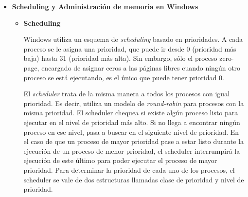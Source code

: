 \documentclass[a4paper,11pt] {article}
\begin{document}
\begin{itemize}
\begin{verbatim}
        input_semilla = (char *)vmalloc(PAGE_SIZE);
        memset(input_semilla, 0, PAGE_SIZE);

        proc_entry = create_proc_entry("probabilidad", 0644, NULL);
    
        if(proc_entry == NULL) {
            printk(KERN_INFO "probabilidad: No se pudo crear la 
              entrada en /proc\n");
        } else {
            proc_entry->read_proc = cant_lecturas;
            proc_entry->write_proc = cambiar_semilla;
            proc_entry->owner = THIS_MODULE;
        }
    }

    return ret;
}

static void __exit probabilidad_exit(void) {
    //Elimino la entrada de proc
    remove_proc_entry("probabilidad", &proc_root);
    vfree(input_semilla);
    //Elimino el dispositivo
    misc_deregister(&probabilidad_dev);
}

module_init(probabilidad_init);
module_exit(probabilidad_exit);
\end{verbatim}  

	El presente módulo se encarga de crear un dipositivo de tipo MISC en /dev/probabilidad que, al ser leído, retorna una letra aleatoria. Para leer el dispositivo, basta con ejecutar el comando \textbf{cat /dev/probabilidad}. Además, provee la opción de cambiar la semilla utilizada para ir generando la secuencia aleatoria, mediante el comando \textbf{echo \textit{semilla} /proc/probabilidad}. Por otro lado, tal como pide el ejercicio, este módulo permite retornar la cantidad de veces que fue leído.

	\item \textbf{Scheduling y Administración de memoria en Windows}

	\begin{itemize}
		\item \textbf{Scheduling}

		Windows utiliza un esquema de \textit{scheduling} basado en prioridades. A cada proceso se le asigna una prioridad, que puede ir desde 0 (prioridad más baja) hasta 31 (prioridad más alta). Sin embargo, sólo el proceso zero-page, encargado de asignar ceros a las páginas libres cuando ningún otro proceso se está ejecutando, es el único que puede tener prioridad 0.

		El \textit{scheduler} trata de la misma manera a todos los procesos con igual prioridad. Es decir, utiliza un modelo de \textit{round-robin} para procesos con la misma prioridad. El scheduler chequea si existe algún proceso listo para ejecutar en el nivel de prioridad más alto. Si no llega a encontrar ningún proceso en ese nivel, pasa a buscar en el siguiente nivel de prioridad. En el caso de que un proceso de mayor prioridad pase a estar listo durante la ejecución de un proceso de menor prioridad, el scheduler interrumpirá la ejecución de este último para poder ejecutar el proceso de mayor prioridad.
		Para determinar la prioridad de cada uno de los procesos, el scheduler se vale de dos estructuras llamadas clase de prioridad y nivel de prioridad.


\end{itemize}
\end{itemize}
\end{document}

